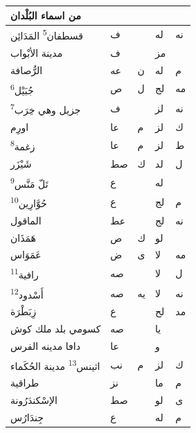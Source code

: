 \documentclass[11pt]{article}
\newcommand{\AbjadZero}{{\NallinoSigns\symbol{"E000}}}
\begin{document}
\begin{Arabic}
\begin{minipage}[t]{0.495\textwidth}
\begin{tabular}{|p{55mm}|>{\centering\arraybackslash}p{4.8mm}>{\centering\arraybackslash}p{4.8mm}|>{\centering\arraybackslash}p{4.8mm}>{\centering\arraybackslash}p{4.8mm}|}
\hline\end{tabular}\end{minipage}\hfill\begin{minipage}[t]{0.495\textwidth}\setlength{\tabcolsep}{2.2pt}\begin{tabular}{|p{55mm}|>{\centering\arraybackslash}p{4.8mm}>{\centering\arraybackslash}p{4.8mm}|>{\centering\arraybackslash}p{4.8mm}>{\centering\arraybackslash}p{4.8mm}|}\hline
\centering من اسماء البُلْدان & \multicolumn{2}{c|}{الطول} & \multicolumn{2}{c|}{العرض} \\ \hline
{}قسطفان\textsuperscript{5} المَدَائِن & ف & \AbjadZero{} & له & نه \\
{}مدينة الأبْواب & ف & \AbjadZero{} & مز & \AbjadZero{} \\
{}الرُّصافة & عه & ن & له & م \\
{}جُبَيْل\textsuperscript{6} & ص & ل & لج & مه \\
{}جزيل وهي خِرَب\textsuperscript{7} & ف & \AbjadZero{} & لز & نه \\
{}اورِم & عا & م & لز & ك \\
{}زغمة\textsuperscript{8} & عا & م & لز & ط \\
{}شَيْزَر & صط & ك & لد & ل \\
{}تَلّ مَنَّس\textsuperscript{9} & ع & \AbjadZero{} & له & \AbjadZero{} \\
{}حُوَّارِين\textsuperscript{10} & ع & \AbjadZero{} & لج & م \\
{}الماقول & عط & \AbjadZero{} & لج & نه \\
{}هَمَذَان & ص & ك & لو & \AbjadZero{} \\
{}عَمَوَاس & ض & ى & لا & مه \\
{}رافية\textsuperscript{11} & صه & \AbjadZero{} & لا & ل \\
{}أَسْدود\textsuperscript{12} & صه & يه & لا & نه \\
{}زِبَطْرَة & ع & \AbjadZero{} & لح & مد \\
{}كسومي بلد ملك كوش & صه & \AbjadZero{} & يا & \AbjadZero{} \\
{}داڡا مدينه الفرس & عا & \AbjadZero{} & و & \AbjadZero{} \\
{}اثينس\textsuperscript{13} مدينة الحُكَماء & نب & م & لز & ك \\
{}طراقية & نز & \AbjadZero{} & ما & م \\
{}الإسْكندَرُونة & صط & \AbjadZero{} & لو & ى \\
{}جِندَارُس & ع & \AbjadZero{} & له & م \\
\hline\end{tabular}\end{minipage}
\end{Arabic}
\end{document}
